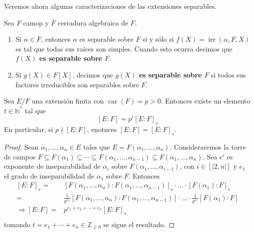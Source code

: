 \documentclass[12pt]{report}
\newcommand{\natint}[1]{\ensuremath{\left[\big|#1\big|\right]}}
\theoremstyle{largebreak}
\DeclareMathOperator{\car}{car}
\DeclareMathOperator{\irr}{irr}
\begin{document}
    Veremos ahora algunas caracterizaciones de las extensiones separables.

    \begin{obs}
        Sea $F$ camop y $\bar{F}$ cerradura algebraica de $F$.
        \begin{enumerate}
            \item Si $\alpha\in\bar{F}$, entonces $\alpha$ es separable sobre $F$ si y sólo si $f(X)=\irr(\alpha, F, X)$ es tal que todas sus raíces son simples. Cuando esto ocurra decimos que \textbf{$f(X)$ es separable sobre $F$}.
            \item Si $g(X)\in F[X]$, decimos que \textbf{$g(X)$ es separable sobre $F$} si todos sus factores irreducibles son separables sobre $F$.
        \end{enumerate}
    \end{obs}

    \begin{propo}
        Sea $E/F$ una extensión finita con $\car(F)=p>0$. Entonces existe un elemento $t\in\mathbb{N}^{*}$ tal que
        \begin{equation}
            \left[E:F\right]=p^t\left[E:F\right]_s
        \end{equation}
        En particular, si $p\nmid \left[E:F\right]$, enotnces $\left[E:F\right]=\left[E:F\right]_s$.
    \end{propo}

    \begin{proof}
        Sean $\alpha_1,\dots,\alpha_n\in E$ tales que $E=F(\alpha_1,\dots,\alpha_n)$. Consideraremos la torre de campos $F\subseteq F(\alpha_1)\subseteq\cdots\subseteq F(\alpha_1,\dots,\alpha_{n-1})\subseteq F(\alpha_1,\dots,\alpha_n)$.
        Sea $e^{i}$ es exponente de inseparabilidad de $\alpha_i$ sobre $F(\alpha_1,\dots,\alpha_{i-1})$, con $i\in\natint{2,n}$ y $e_1$ el grado de inseparabilidad de $\alpha_1$ sobre $F$. Entonces
        \begin{equation*}
            \begin{split}
                \left[E:F\right]_s=&\left[F(\alpha_1,\dots,\alpha_n):F(\alpha_1,\dots,\alpha_{n-1})\right]_s\cdot\dots\cdot[F(\alpha_1):F]_s\\
                =&\frac{1}{p^{e_n}} \left[F(\alpha_1,\dots,\alpha_n):F(\alpha_1,\dots,\alpha_{n-1})\right]\cdot\dots\cdot\frac{1}{p^{e_1}}[F(\alpha_1):F]\\
                \Rightarrow [E:F]=&p^{e_1+e_2+\cdots+e_n}\left[E:F\right]_s\\
            \end{split}
        \end{equation*}
        tomando $t=e_1+\cdots+e_n\in\mathbb{Z}_{\geq0}$ se sigue el resultado.
    \end{proof}
\end{document}

